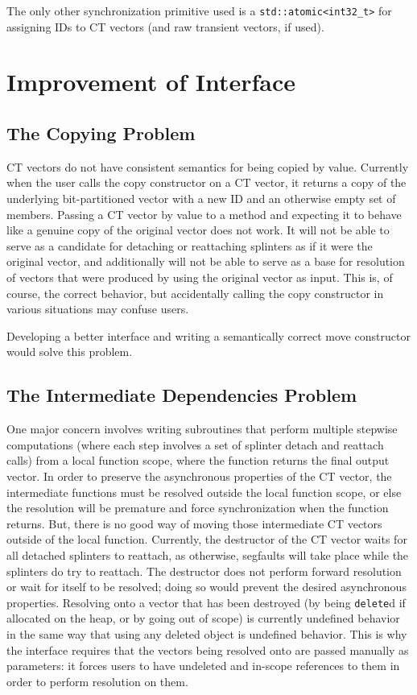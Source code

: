 The only other synchronization primitive used is a
\texttt{std::atomic<int32\_t>} for assigning IDs to CT vectors (and raw
transient vectors, if used).

\section{Improvement of Interface}

\subsection{The Copying Problem}
CT vectors do not have consistent semantics for being copied by value. Currently
when the user calls the copy constructor on a CT vector, it returns a copy of
the underlying bit-partitioned vector with a new ID and an otherwise empty set
of members. Passing a CT vector by value to a method and expecting it to behave
like a genuine copy of the original vector does not work. It will not be able to
serve as a candidate for detaching or reattaching splinters as if it were the
original vector, and additionally will not be able to serve as a base for
resolution of vectors that were produced by using the original vector as input.
This is, of course, the correct behavior, but accidentally calling the copy
constructor in various situations may confuse users.

Developing a better interface and writing a semantically correct move
constructor would solve this problem.

\subsection{The Intermediate Dependencies Problem}
One major concern involves
writing subroutines that perform multiple stepwise computations (where each step
involves a set of splinter detach and reattach calls) from a local function
scope, where the function returns the final output vector. In order to preserve
the asynchronous properties of the CT vector, the intermediate functions must
be resolved outside the local function scope, or else the resolution will be
premature and force synchronization when the function returns. But, there is no
good way of moving those intermediate CT vectors outside of the local function.
Currently, the destructor of the CT vector waits for all detached splinters to
reattach, as otherwise, segfaults will take place while the splinters do try to
reattach. The destructor does not perform forward resolution or wait for itself
to be resolved; doing so would prevent the desired asynchronous properties.
Resolving onto a vector that has been destroyed (by being \texttt{delete}d if
allocated on the heap, or by going out of scope) is currently undefined behavior
in the same way that using any deleted object is undefined behavior. This is why
the interface requires that the vectors being resolved onto are passed manually
as parameters: it forces users to have undeleted and in-scope references to
them in order to perform resolution on them.
